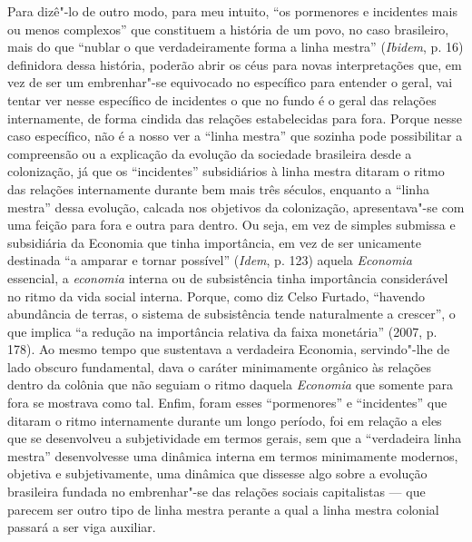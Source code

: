 Para dizê"-lo de outro modo, para meu intuito, ``os pormenores e
incidentes mais ou menos complexos'' que constituem a história de um
povo, no caso brasileiro, mais do que ``nublar o que verdadeiramente
forma a linha mestra'' (\emph{Ibidem}, p. 16) definidora dessa história,
poderão abrir os céus para novas interpretações que, em vez de ser um
embrenhar"-se equivocado no específico para entender o geral, vai tentar
ver nesse específico de incidentes o que no fundo é o geral das relações
internamente, de forma cindida das relações estabelecidas para fora.
Porque nesse caso específico, não é a nosso ver a ``linha mestra'' que
sozinha pode possibilitar a compreensão ou a explicação da evolução da
sociedade brasileira desde a colonização, já que os ``incidentes''
subsidiários à linha mestra ditaram o ritmo das relações internamente
durante bem mais três séculos, enquanto a ``linha mestra'' dessa
evolução, calcada nos objetivos da colonização, apresentava"-se com uma
feição para fora e outra para dentro. Ou seja, em vez de simples
submissa e subsidiária da Economia que tinha importância, em vez de ser
unicamente destinada ``a amparar e tornar possível'' (\emph{Idem}, p.
123) aquela \emph{Economia} essencial, a \emph{economia} interna ou de
subsistência tinha importância considerável no ritmo da vida social
interna. Porque, como diz Celso Furtado, ``havendo abundância de terras,
o sistema de subsistência tende naturalmente a crescer'', o que implica
``a redução na importância relativa da faixa monetária'' (2007, p.
178). Ao mesmo tempo que sustentava a verdadeira Economia, servindo"-lhe
de lado obscuro fundamental, dava o caráter minimamente orgânico às
relações dentro da colônia que não seguiam o ritmo daquela
\emph{Economia} que somente para fora se mostrava como tal. Enfim, foram
esses ``pormenores'' e ``incidentes'' que ditaram o ritmo internamente
durante um longo período, foi em relação a eles que se desenvolveu a
subjetividade em termos gerais, sem que a ``verdadeira linha mestra''
desenvolvesse uma dinâmica interna em termos minimamente modernos,
objetiva e subjetivamente, uma dinâmica que dissesse algo sobre a
evolução brasileira fundada no embrenhar"-se das relações sociais
capitalistas --- que parecem ser outro tipo de linha mestra perante a
qual a linha mestra colonial passará a ser viga auxiliar.

